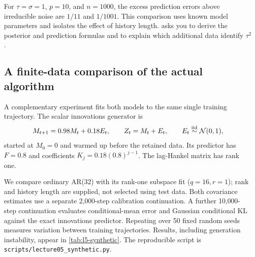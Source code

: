 \documentclass[11pt,twoside]{article}
\theoremstyle{definition}
\theoremstyle{remark}
\begin{document}
For \(\tau=\sigma=1\), \(p=10\), and \(n=1000\), the excess prediction
errors above irreducible noise are \(1/11\) and \(1/1001\).
This comparison uses known model parameters and isolates the effect of
history length.  asks you to derive the posterior and
prediction formulas and to explain which additional data identify \(\tau^2\).

\subsection{A finite-data comparison of the actual algorithm}
\label{sec:synthetic-experiment}

A complementary experiment fits both models to the same single training
trajectory. The scalar innovations generator is
\[
 M_{t+1}=0.98M_t+0.18E_t,\qquad Z_t=M_t+E_t,\qquad
 E_t\stackrel{\rm iid}{\sim}\mathcal N(0,1),
\]
started at \(M_0=0\) and warmed up before the retained data.
Its predictor has \(F=0.8\) and coefficients \(K_j=0.18(0.8)^{j-1}\).
The lag-Hankel matrix has rank one.

We compare ordinary AR(32) with its rank-one subspace fit
(\(q=16,r=1\)); rank and history length are supplied, not selected
using test data. Both covariance estimates use a separate 2,000-step
calibration continuation. A further 10,000-step continuation evaluates
conditional-mean error and Gaussian conditional KL against the exact
innovations predictor. Repeating over 50 fixed random seeds measures
variation between training trajectories. Results, including generation
instability, appear in \cref{tab:l5-synthetic}.
The reproducible script is
\texttt{scripts/lecture05\_synthetic.py}.



\end{document}
